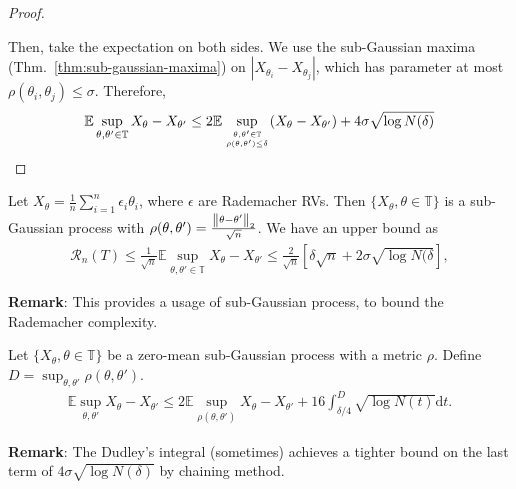 \begin{proof}
\begin{center}
\end{center}
Then, take the expectation on both sides. We use the sub-Gaussian maxima (Thm.~\ref{thm:sub-gaussian-maxima}) on $|X_{\theta_i} - X_{\theta_j}|$, which has  parameter at most $\rho(\theta_i, \theta_j) \leq \sigma$.
Therefore,
\begin{align*}
    \mathbb{E} \sup_{\theta, \theta' \in \mathbb{T}} X_\theta - X_{\theta'} \leq 2 \mathbb{E} \sup_{\theta, \theta' \in \mathbb{T}\atop \rho(\theta, \theta')\leq \delta} (X_\theta - X_{\theta'}) + 4 \sigma \sqrt{\log N(\delta)}
\end{align*}
\end{proof}
\begin{theorem} Let $X_\theta = \frac{1}{n} \sum_{i=1}^n \epsilon_i \theta_i$, where $\epsilon$ are Rademacher RVs. Then $\{X_\theta, \theta \in \mathbb{T} \}$ is a sub-Gaussian process with $\rho(\theta, \theta') = \frac{\left\lVert \theta - \theta' \right\rVert_2}{\sqrt{n}}$. We have an upper bound as
\begin{align*}
    \mathcal{R}_n(T) \leq \frac{1}{\sqrt{n}} \mathbb{E} \sup_{\theta, \theta' \in \mathbb{T}} X_\theta - X_{\theta'} \leq \frac{2}{\sqrt{n}}[\delta \sqrt{n} + 2\sigma \sqrt{\log N(\delta}],
\end{align*}
\end{theorem}
\textbf{Remark}: This provides a usage of sub-Gaussian process, to bound the Rademacher complexity.

\begin{theorem} 
Let $\{X_\theta, \theta \in \mathbb{T} \}$ be a zero-mean sub-Gaussian process with a  metric $\rho$. Define $D = \sup_{\theta, \theta'} \rho(\theta, \theta')$.
\begin{align*}
    \mathbb{E} \sup_{\theta, \theta'} X_\theta - X_{\theta'} \leq 2 \mathbb{E} \sup_{\rho(\theta, \theta')} X_\theta - X_{\theta'} + 16 \int^D_{\delta/4} \sqrt{\log N(t)} \mathrm{d}t.
\end{align*}
\end{theorem}
\textbf{Remark}: The Dudley's integral (sometimes) achieves a tighter bound on the last term of $4\sigma \sqrt{\log N(\delta)}$ by chaining method.

